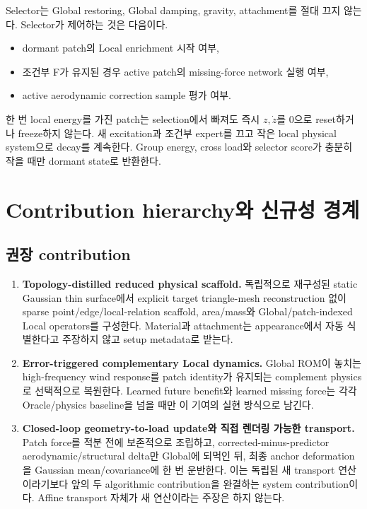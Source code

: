 \documentclass[11pt,a4paper]{article}
\begin{document}
Selector는 Global restoring, Global damping, gravity, attachment를 절대 끄지 않는다.
Selector가 제어하는 것은 다음이다.

\begin{itemize}[leftmargin=1.5em]
  \item dormant patch의 Local enrichment 시작 여부,
  \item 조건부 F가 유지된 경우 active patch의 missing-force network 실행 여부,
  \item active aerodynamic correction sample 평가 여부.
\end{itemize}

한 번 local energy를 가진 patch는 selection에서 빠져도 즉시 \(z,\dot z\)를 0으로 reset하거나 freeze하지 않는다.
새 excitation과 조건부 expert를 끄고 작은 local physical system으로 decay를 계속한다.
Group energy, cross load와 selector score가 충분히 작을 때만 dormant state로 반환한다.

\section{Contribution hierarchy와 신규성 경계}

\subsection{권장 contribution}

\begin{enumerate}[leftmargin=1.7em]
  \item \textbf{Topology-distilled reduced physical scaffold.}
  독립적으로 재구성된 static Gaussian thin surface에서
  explicit target triangle-mesh reconstruction 없이 sparse point/edge/local-relation scaffold,
  area/mass와 Global/patch-indexed Local operators를 구성한다.
  Material과 attachment는 appearance에서 자동 식별한다고 주장하지 않고 setup metadata로 받는다.
  \item \textbf{Error-triggered complementary Local dynamics.}
  Global ROM이 놓치는 high-frequency wind response를 patch identity가 유지되는 complement physics로 선택적으로 복원한다.
  Learned future benefit와 learned missing force는 각각 Oracle/physics baseline을 넘을 때만 이 기여의 실현 방식으로 남긴다.
  \item \textbf{Closed-loop geometry-to-load update와 직접 렌더링 가능한 transport.}
  Patch force를 적분 전에 보존적으로 조립하고, corrected-minus-predictor aerodynamic/structural delta만 Global에 되먹인 뒤,
  최종 anchor deformation을 Gaussian mean/covariance에 한 번 운반한다.
  이는 독립된 새 transport 연산이라기보다 앞의 두 algorithmic contribution을 완결하는 system contribution이다.
  Affine transport 자체가 새 연산이라는 주장은 하지 않는다.
\end{enumerate}
\end{document}
